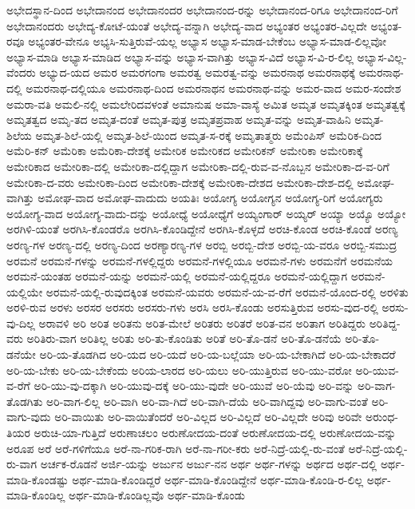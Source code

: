 {ಅಭೇದಸ್ಥಾನ-ದಿಂದ
ಅಭೇದಾನಂದ
ಅಭೇದಾನಂದರ
ಅಭೇದಾನಂದ-ರನ್ನು
ಅಭೇದಾನಂದ-ರಿಗೂ
ಅಭೇದಾನಂದ-ರಿಗೆ
ಅಭೇದಾನಂದರು
ಅಭೇದ್ಯ-ಕೋಟೆ-ಯಂತೆ
ಅಭೇದ್ಯ-ವನ್ನಾಗಿ
ಅಭೇದ್ಯ-ವಾದ
ಅಭ್ಯಂತರ
ಅಭ್ಯಂತರ-ವಿಲ್ಲದೇ
ಅಭ್ಯಂತ-ರವೂ
ಅಭ್ಯಂತರ-ವೇನೂ
ಅಭ್ಯಸಿ-ಸುತ್ತಿರುವೆ-ಯಲ್ಲ
ಅಭ್ಯಾಸ
ಅಭ್ಯಾಸ-ಮಾಡ-ಬೇಕೆಂಬ
ಅಭ್ಯಾಸ-ಮಾಡ-ಲಿಲ್ಲವೋ
ಅಭ್ಯಾಸ-ಮಾಡಿ
ಅಭ್ಯಾಸ-ಮಾಡಿದ
ಅಭ್ಯಾಸ-ವನ್ನು
ಅಭ್ಯಾಸ-ವಾಗಿತ್ತು
ಅಭ್ಯಾಸ-ವಿದೆ
ಅಭ್ಯಾಸ-ವಿ-ರ-ಲಿಲ್ಲ
ಅಭ್ಯಾಸ-ವಿಲ್ಲ-ವೆಂದರು
ಅಭ್ಯುದ-ಯದ
ಅಮರ
ಅಮರಗಂಗಾ
ಅಮರತ್ವ
ಅಮರತ್ವ-ವನ್ನು
ಅಮರನಾಥ
ಅಮರನಾಥಕ್ಕೆ
ಅಮರನಾಥ-ದಲ್ಲಿ
ಅಮರನಾಥ-ದಲ್ಲಿಯೂ
ಅಮರನಾಥ-ದಿಂದ
ಅಮರನಾಥನ
ಅಮರನಾಥ-ವನ್ನು
ಅಮರ-ವಾದ
ಅಮರ-ಸಂದೇಶ
ಅಮರಾ-ವತಿ
ಅಮಲಿ-ನಲ್ಲಿ
ಅಮಲೇರಿದವಳಂತೆ
ಅಮಾನುಷ
ಅಮಾ-ವಾಸ್ಯೆ
ಅಮಿತ
ಅಮೃತ
ಅಮೃತಕ್ಕಿಂತ
ಅಮೃತತ್ವಕ್ಕೆ
ಅಮೃತತ್ವದ
ಅಮೃ-ತದ
ಅಮೃತ-ದಂತೆ
ಅಮೃತ-ಪುತ್ರ
ಅಮೃತಪ್ರವಾಹ
ಅಮೃತ-ವನ್ನು
ಅಮೃತ-ವಾಹಿನಿ
ಅಮೃತ-ಶಿಲೆಯ
ಅಮೃತ-ಶಿಲೆ-ಯಲ್ಲಿ
ಅಮೃತ-ಶಿಲೆ-ಯಿಂದ
ಅಮೃತ-ಸ-ರಕ್ಕೆ
ಅಮೃತಾತ್ಮರು
ಅಮೆಂಪಿಸ್
ಅಮೆರಿಕ-ದಿಂದ
ಅಮೆರಿ-ಕನ್
ಅಮೆರಿಕಾ
ಅಮೆರಿಕಾ-ದೇಶಕ್ಕೆ
ಅಮೇರಿಕ
ಅಮೇರಿಕದ
ಅಮೇರಿಕನ್
ಅಮೇರಿಕಾ
ಅಮೇರಿಕಾಕ್ಕೆ
ಅಮೇರಿಕಾದ
ಅಮೇರಿಕಾ-ದಲ್ಲಿ
ಅಮೇರಿಕಾ-ದಲ್ಲಿದ್ದಾಗ
ಅಮೇರಿಕಾ-ದಲ್ಲಿ-ರುವ-ವ-ನೊಬ್ಬನ
ಅಮೇರಿಕಾ-ದ-ವ-ರಿಗೆ
ಅಮೇರಿಕಾ-ದ-ವರು
ಅಮೇರಿಕಾ-ದಿಂದ
ಅಮೇರಿಕಾ-ದೇಶಕ್ಕೆ
ಅಮೇರಿಕಾ-ದೇಶದ
ಅಮೇರಿಕಾ-ದೇಶ-ದಲ್ಲಿ
ಅಮೋಘ-ವಾಗಿತ್ತು
ಅಮೋಘ-ವಾದ
ಅಮೋಘ-ವಾದುದು
ಅಯತಿಃ
ಅಯೋಗ್ಯ
ಅಯೋಗ್ಯನ
ಅಯೋಗ್ಯ-ರಿಗೆ
ಅಯೋಗ್ಯರು
ಅಯೋಗ್ಯ-ವಾದ
ಅಯೋಗ್ಯ-ವಾದು-ದನ್ನು
ಅಯೋಧ್ಯೆ
ಅಯೋಧ್ಯೆಗೆ
ಅಯ್ಯಂಗಾರ್
ಅಯ್ಯರ್
ಅಯ್ಯಾ
ಅಯ್ಯೊ
ಅಯ್ಯೋ
ಅರಗಿಳಿ-ಯಂತೆ
ಅರಗಿಸಿ-ಕೊಂಡರೊ
ಅರಗಿಸಿ-ಕೊಂಡಿದ್ದೇನೆ
ಅರಗಿಸಿ-ಕೊಳ್ಳದೆ
ಅರಚಿ-ಕೊಂಡ
ಅರಚಿ-ಕೊಂಡೆ
ಅರಣ್ಯ
ಅರಣ್ಯ-ಗಳ
ಅರಣ್ಯ-ದಲ್ಲಿ
ಅರಣ್ಯ-ದಿಂದ
ಅರಣ್ಯಾರಣ್ಯ-ಗಳ
ಅರಬ್ಬಿ
ಅರಬ್ಬಿ-ದೇಶ
ಅರಬ್ಬಿ-ಯ-ವರೂ
ಅರಬ್ಬಿ-ಸಮುದ್ರ
ಅರಮನೆ
ಅರಮನೆ-ಗಳನ್ನು
ಅರಮನೆ-ಗಳಲ್ಲಿದ್ದರು
ಅರಮನೆ-ಗಳಲ್ಲಿಯೂ
ಅರಮನೆ-ಗಳು
ಅರಮನೆಗೆ
ಅರಮನೆಯ
ಅರಮನೆ-ಯಂತಹ
ಅರಮನೆ-ಯನ್ನು
ಅರಮನೆ-ಯಲ್ಲಿ
ಅರಮನೆ-ಯಲ್ಲಿದ್ದರೂ
ಅರಮನೆ-ಯಲ್ಲಿದ್ದಾಗ
ಅರಮನೆ-ಯಲ್ಲಿಯೇ
ಅರಮನೆ-ಯಲ್ಲಿ-ರುವುದಕ್ಕಿಂತ
ಅರಮನೆ-ಯವರು
ಅರಮನೆ-ಯ-ವ-ರೆಗೆ
ಅರಮನೆ-ಯೊಂದ-ರಲ್ಲಿ
ಅರಳಿತು
ಅರಳಿ-ರುವ
ಅರಳು
ಅರಸರ
ಅರಸರು
ಅರಸರು-ಗಳು
ಅರಸಿ
ಅರಸಿ-ಕೊಂಡು
ಅರಸುತ್ತಿರುವ
ಅರಸು-ವುದ-ರಲ್ಲಿ
ಅರಸು-ವು-ದಿಲ್ಲ
ಅರಾವಳಿ
ಅರಿ
ಅರಿತ
ಅರಿತನು
ಅರಿತ-ಮೇಲೆ
ಅರಿತರು
ಅರಿತರೆ
ಅರಿತ-ವನ
ಅರಿತಾಗ
ಅರಿತಿದ್ದರು
ಅರಿತಿದ್ದ-ವರು
ಅರಿತಿರು-ವಾಗ
ಅರಿತಿಲ್ಲ
ಅರಿತು
ಅರಿ-ತು-ಕೊಂಡಿತು
ಅರಿತೆ
ಅರಿ-ತೊ-ಡನೆ
ಅರಿ-ತೊ-ಡನೆಯೆ
ಅರಿ-ತೊ-ಡನೆಯೇ
ಅರಿ-ಯ-ತೊಡಗಿದ
ಅರಿ-ಯದ
ಅರಿ-ಯದೆ
ಅರಿ-ಯ-ಬಲ್ಲೆಯಾ
ಅರಿ-ಯ-ಬೇಕಾಗಿದೆ
ಅರಿ-ಯ-ಬೇಕಾದರೆ
ಅರಿ-ಯ-ಬೇಕು
ಅರಿ-ಯ-ಬೇಕೆಂದು
ಅರಿಯ-ಲಾರದ
ಅರಿ-ಯಲು
ಅರಿ-ಯುತ್ತಿರುವ
ಅರಿ-ಯು-ವರೋ
ಅರಿ-ಯುವ-ವ-ರೆಗೆ
ಅರಿ-ಯು-ವು-ದಕ್ಕಾಗಿ
ಅರಿ-ಯುವು-ದಕ್ಕೆ
ಅರಿ-ಯು-ವುದೇ
ಅರಿ-ಯುವೆ
ಅರಿ-ಯೆವು
ಅರಿ-ವನ್ನು
ಅರಿ-ವಾಗ-ತೊಡಗಿತು
ಅರಿ-ವಾಗ-ಲಿಲ್ಲ
ಅರಿ-ವಾಗಿ
ಅರಿ-ವಾ-ಗಿದೆ
ಅರಿ-ವಾಗಿ-ದೆಯೆ
ಅರಿ-ವಾಗಿದ್ದವು
ಅರಿ-ವಾಗು-ವಂತೆ
ಅರಿ-ವಾಗು-ವುದು
ಅರಿ-ವಾಯಿತು
ಅರಿ-ವಾಯಿತೆಂದರೆ
ಅರಿ-ವಿಲ್ಲದ
ಅರಿ-ವಿಲ್ಲದೆ
ಅರಿ-ವಿಲ್ಲದೇ
ಅರಿವು
ಅರಿವೇ
ಅರುಂಧ-ತಿಯರ
ಅರುಚಿ-ಯಾ-ಗುತ್ತಿದೆ
ಅರುಣಾಚಲಂ
ಅರುಣೋದಯ-ದಂತೆ
ಅರುಣೋದಯ-ದಲ್ಲಿ
ಅರುಣೋದಯ-ವನ್ನು
ಅರೂಪ
ಅರೆ
ಅರೆ-ಗಳಿಗೆಯೂ
ಅರೆ-ನಾ-ಗರಿಕ-ರಾಗಿ
ಅರೆ-ನಾ-ಗರೀ-ಕರು
ಅರೆ-ನಿದ್ರೆ-ಯಲ್ಲಿ-ರು-ವಂತೆ
ಅರೆ-ನಿದ್ರೆ-ಯಲ್ಲಿ-ರು-ವಾಗ
ಅರ್ಚಕ-ರೊಡನೆ
ಅರ್ಜಿ-ಯನ್ನು
ಅರ್ಜುನ
ಅರ್ಜು-ನನ
ಅರ್ಥ
ಅರ್ಥ-ಗಳನ್ನು
ಅರ್ಥದ
ಅರ್ಥ-ದಲ್ಲಿ
ಅರ್ಥ-ಮಾಡಿ-ಕೊಂಡಷ್ಟು
ಅರ್ಥ-ಮಾಡಿ-ಕೊಂಡಿದ್ದರೆ
ಅರ್ಥ-ಮಾಡಿ-ಕೊಂಡಿದ್ದೇನೆ
ಅರ್ಥ-ಮಾಡಿ-ಕೊಂಡಿ-ರ-ಲಿಲ್ಲ
ಅರ್ಥ-ಮಾಡಿ-ಕೊಂಡಿಲ್ಲ
ಅರ್ಥ-ಮಾಡಿ-ಕೊಂಡಿಲ್ಲವೊ
ಅರ್ಥ-ಮಾಡಿ-ಕೊಂಡು
}
